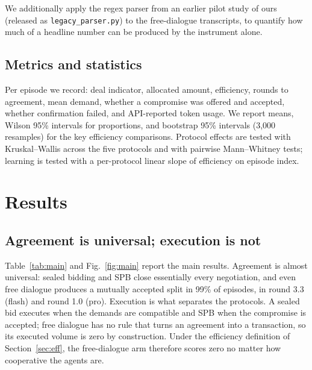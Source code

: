 \documentclass[11pt]{article}
\begin{document}
We additionally apply the regex parser from an earlier pilot study of ours (released as \texttt{legacy\_parser.py}) to the free-dialogue transcripts, to quantify how much of a headline number can be produced by the instrument alone.

\subsection{Metrics and statistics}

Per episode we record: deal indicator, allocated amount, efficiency, rounds to agreement, mean demand, whether a compromise was offered and accepted, whether confirmation failed, and API-reported token usage. We report means, Wilson 95\% intervals for proportions, and bootstrap 95\% intervals (3{,}000 resamples) for the key efficiency comparisons. Protocol effects are tested with Kruskal--Wallis across the five protocols and with pairwise Mann--Whitney tests; learning is tested with a per-protocol linear slope of efficiency on episode index.

\section{Results}
\label{sec:results}

\subsection{Agreement is universal; execution is not}

Table~\ref{tab:main} and Fig.~\ref{fig:main} report the main results. Agreement is almost universal: sealed bidding and SPB close essentially every negotiation, and even free dialogue produces a mutually accepted split in 99\% of episodes, in round 3.3 (flash) and round 1.0 (pro). Execution is what separates the protocols. A sealed bid executes when the demands are compatible and SPB when the compromise is accepted; free dialogue has no rule that turns an agreement into a transaction, so its executed volume is zero by construction. Under the efficiency definition of Section~\ref{sec:eff}, the free-dialogue arm therefore scores zero no matter how cooperative the agents are.
\end{document}
